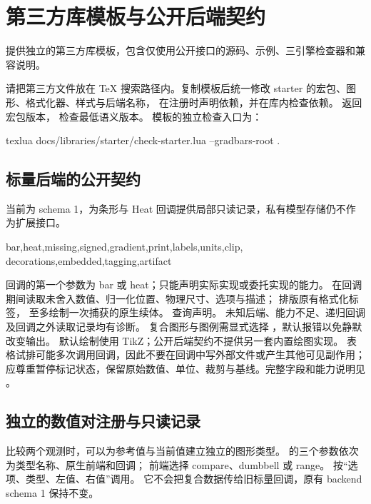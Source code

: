 \section{第三方库模板与公开后端契约}
 提供独立的第三方库模板，包含仅使用公开接口的源码、示例、三引擎检查器和兼容说明。
\begin{codeonly}
\usepackage[libraries=none]{gradbars}
\end{codeonly}
请把第三方文件放在 TeX 搜索路径内。复制模板后统一修改 starter 的宏包、图形、格式化器、样式与后端名称，
在注册时声明依赖，并在库内检查依赖。
\key{\gradbarsversion} 返回宏包版本， 检查最低语义版本。
模板的独立检查入口为：
\begin{codeonly}
texlua docs/libraries/starter/check-starter.lua --gradbars-root .
\end{codeonly}
\subsection{标量后端的公开契约}
\key{\gradbarsbackendversion} 当前为 schema 1，为条形与 Heat 回调提供局部只读记录，私有模型存储仍不作为扩展接口。
\begin{codeonly}
 {bar,heat,missing,signed,gradient,print,labels,units,clip,
  decorations,embedded,tagging,artifact}
 {\gradbarsbackenddefault}
\end{codeonly}
回调的第一个参数为 bar 或 heat；只能声明实际实现或委托实现的能力。
 在回调期间读取未舍入数值、归一化位置、物理尺寸、选项与描述；
\key{\gradbarsbackendlabel} 排版原有格式化标签，\key{\gradbarsbackenddefault} 至多绘制一次捕获的原生续体。
 查询声明。
未知后端、能力不足、递归回调及回调之外读取记录均有诊断。
复合图形与图例需显式选择 ，默认报错以免静默改变输出。
默认绘制使用 TikZ；公开后端契约不提供另一套内置绘图实现。
表格试排可能多次调用回调，因此不要在回调中写外部文件或产生其他可见副作用；
应尊重暂停标记状态，保留原始数值、单位、裁剪与基线。完整字段和能力说明见 。

\clearpage
\subsection{独立的数值对注册与只读记录}
\label{sec:pair-extensions-cn}
比较两个观测时，可以为参考值与当前值建立独立的图形类型。
\key{\gradbarsdeclarepairtype} 的三个参数依次为类型名称、原生前端和回调；
前端选择 compare、dumbbell 或 range。
\key{\gradpairgraphic} 按“选项、类型、左值、右值”调用。
它不会把复合数据传给旧标量回调，原有 backend schema 1 保持不变。

